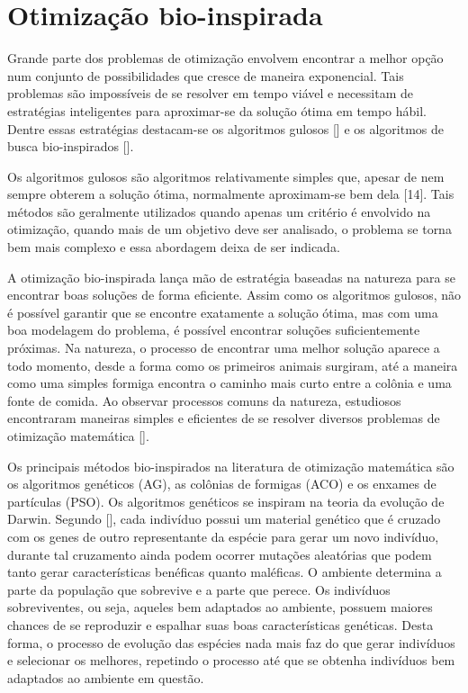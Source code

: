 \chapter[Otimização bio-inspirada]{Otimização bio-inspirada}

Grande parte dos problemas de otimização envolvem encontrar a melhor opção num conjunto de possibilidades que cresce de maneira exponencial. Tais problemas são impossíveis de se resolver em tempo viável e necessitam de estratégias inteligentes para aproximar-se da solução ótima em tempo hábil. Dentre essas estratégias destacam-se os algoritmos gulosos [] e os algoritmos de busca bio-inspirados [].

Os algoritmos gulosos são algoritmos relativamente simples que, apesar de nem sempre obterem a solução ótima, normalmente aproximam-se bem dela [14]. Tais métodos são geralmente utilizados quando apenas um critério é envolvido na otimização, quando mais de um objetivo deve ser analisado, o problema se torna bem mais complexo e essa abordagem deixa de ser indicada.

A otimização bio-inspirada lança mão de estratégia baseadas na natureza para se encontrar boas soluções de forma eficiente. Assim como os algoritmos gulosos, não é possível garantir que se encontre exatamente a solução ótima, mas com uma boa modelagem do problema, é possível encontrar soluções suficientemente próximas. Na natureza, o processo de encontrar uma melhor solução aparece a todo momento, desde a forma como os primeiros animais surgiram, até a maneira como uma simples formiga encontra o caminho mais curto entre a colônia e uma fonte de comida. Ao observar processos comuns da natureza, estudiosos encontraram maneiras simples e eficientes de se resolver diversos problemas de otimização matemática [].

Os principais métodos bio-inspirados na literatura de otimização matemática são os algoritmos genéticos (AG), as colônias de formigas (ACO) e os enxames de partículas (PSO). Os algoritmos genéticos se inspiram na teoria da evolução de Darwin. Segundo [], cada indivíduo possui um material genético que é cruzado com os genes de outro representante da espécie para gerar um novo indivíduo, durante tal cruzamento ainda podem ocorrer mutações aleatórias que podem tanto gerar características benéficas quanto maléficas. O ambiente determina a parte da população que sobrevive e a parte que perece. Os indivíduos sobreviventes, ou seja, aqueles bem adaptados ao ambiente, possuem maiores chances de se reproduzir e espalhar suas boas características genéticas. Desta forma, o processo de evolução das espécies nada mais faz do que gerar indivíduos e selecionar os melhores, repetindo o processo até que se obtenha indivíduos bem adaptados ao ambiente em questão. 

